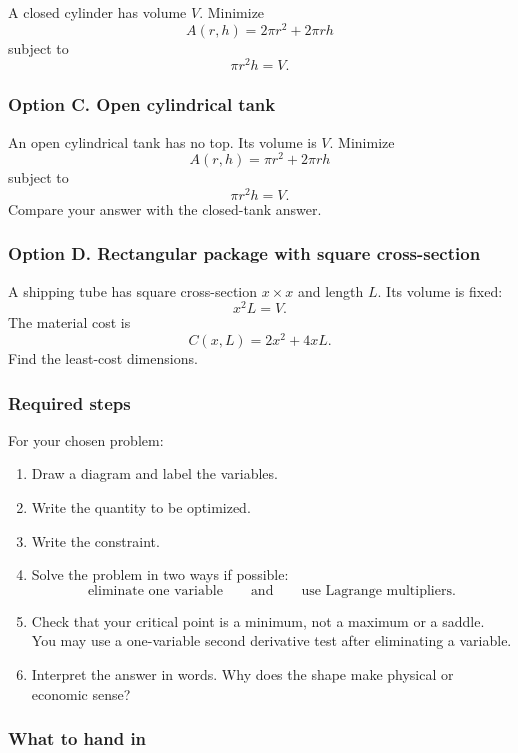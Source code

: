 A closed cylinder has volume \(V\).  Minimize
\[
    A(r,h)=2\pi r^2+2\pi rh
\]
subject to
\[
    \pi r^2h=V.
\]

\subsubsection*{Option C. Open cylindrical tank}

An open cylindrical tank has no top.  Its volume is \(V\).  Minimize
\[
    A(r,h)=\pi r^2+2\pi rh
\]
subject to
\[
    \pi r^2h=V.
\]
Compare your answer with the closed-tank answer.

\subsubsection*{Option D. Rectangular package with square cross-section}

A shipping tube has square cross-section \(x\times x\) and length \(L\).  Its volume is
fixed:
\[
    x^2L=V.
\]
The material cost is
\[
    C(x,L)=2x^2+4xL.
\]
Find the least-cost dimensions.

\subsubsection*{Required steps}

For your chosen problem:

\begin{enumerate}
\item Draw a diagram and label the variables.

\item Write the quantity to be optimized.

\item Write the constraint.

\item Solve the problem in two ways if possible:
\[
\text{eliminate one variable}
\qquad\text{and}\qquad
\text{use Lagrange multipliers}.
\]

\item Check that your critical point is a minimum, not a maximum or a saddle.  You may
use a one-variable second derivative test after eliminating a variable.

\item Interpret the answer in words.  Why does the shape make physical or economic
sense?
\end{enumerate}

\subsubsection*{What to hand in}

